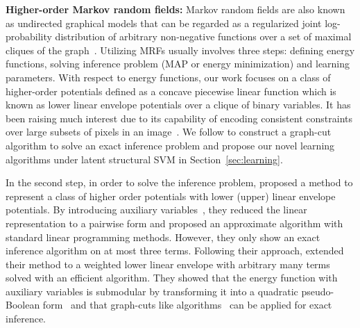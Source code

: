 

\textbf{Higher-order Markov random fields:} Markov random
  fields are also known as undirected graphical models
that can be regarded as a regularized joint log-probability
distribution of arbitrary non-negative functions over a set of
maximal cliques of the graph~\cite{bishop:2006:PRML}. Utilizing
MRFs usually involves three steps: defining energy
  functions, solving inference problem (MAP or energy
minimization) and learning parameters. With respect to energy
  functions, our work focuses on a class of higher-order
potentials defined as a concave piecewise linear function which
is known as lower linear envelope potentials over a clique
of binary variables. It has been raising much interest due to its
capability of encoding consistent constraints over large subsets
of pixels in an image~\cite{Kohli:CVPR07,Nowozin:2011, Song2015}. We follow
 to construct a graph-cut algorithm to
solve an exact inference problem and propose our novel learning
algorithms under latent structural SVM in
Section~\ref{sec:learning}.

In the second step, in order to solve the inference problem,
 proposed a method to represent a class
of higher order potentials with lower (upper) linear envelope
potentials. By introducing auxiliary
variables~\cite{Kohli:CVPR10}, they reduced the linear
representation to a pairwise form and proposed an approximate
algorithm with standard linear programming methods. However, they
only show an exact inference algorithm on at most three terms.
Following their approach,  extended their
method to a weighted lower linear envelope with arbitrary many
terms solved with an efficient algorithm. They showed that the
energy function with auxiliary variables is submodular by
transforming it into a quadratic pseudo-Boolean
form~\cite{Boros:MATH02} and that graph-cuts like
algorithms~\cite{Boykov:ICCV01} can be applied for exact
inference.

